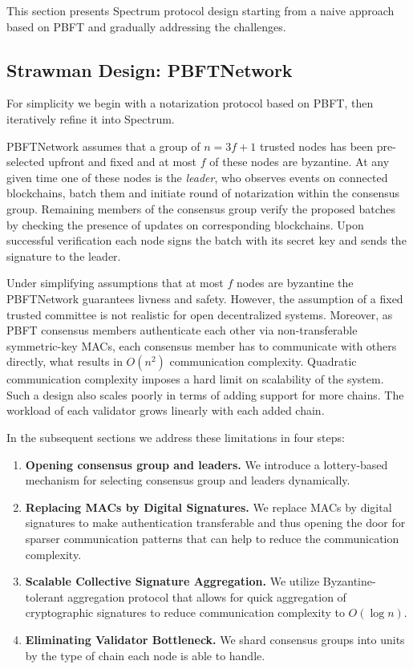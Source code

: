 This section presents Spectrum protocol design starting from a naive approach based on PBFT and gradually addressing the challenges.

\subsection{Strawman Design: PBFTNetwork}\label{subsec:strawman-design}

For simplicity we begin with a notarization protocol based on PBFT, then iteratively refine it into Spectrum.

PBFTNetwork assumes that a group of ${n = 3f + 1}$ trusted nodes has been pre-selected upfront and fixed and at most $f$ of these nodes are byzantine.
At any given time one of these nodes is the \emph{leader}, who observes events on connected blockchains,
batch them and initiate round of notarization within the consensus group.
Remaining members of the consensus group verify the proposed batches by checking the presence of updates on corresponding blockchains.
Upon successful verification each node signs the batch with its secret key and sends the signature to the leader.

Under simplifying assumptions that at most $f$ nodes are byzantine the PBFTNetwork guarantees livness and safety.
However, the assumption of a fixed trusted committee is not realistic for open decentralized systems.
Moreover, as PBFT consensus members authenticate each other via non-transferable symmetric-key MACs, each consensus
member has to communicate with others directly, what results in $O(n^2)$ communication complexity.
Quadratic communication complexity imposes a hard limit on scalability of the system.
Such a design also scales poorly in terms of adding support for more chains.
The workload of each validator grows linearly with each added chain.

In the subsequent sections we address these limitations in four steps:
\begin{enumerate}
    \item \textbf{Opening consensus group and leaders.} We introduce a lottery-based mechanism for selecting consensus group and leaders dynamically.
    \item \textbf{Replacing MACs by Digital Signatures.} We replace MACs by digital signatures to make authentication transferable
    and thus opening the door for sparser communication patterns that can help to reduce the communication complexity.
    \item \textbf{Scalable Collective Signature Aggregation.} We utilize Byzantine-tolerant aggregation protocol that allows for
    quick aggregation of cryptographic signatures to reduce communication complexity to $O(\log n)$.
    \item \textbf{Eliminating Validator Bottleneck.} We shard consensus groups into units by the type of chain each node is able to handle.
\end{enumerate}

